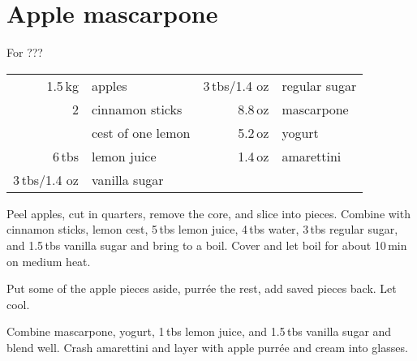 \section{Apple mascarpone}
\begin{centering}
\end{centering}
For ???
\begin{table}[H]
\centering
\begin{tabular*}{1\textwidth}{rlrl}
1.5\,kg & apples & 3\,tbs/1.4 oz & regular sugar \\
2 & cinnamon sticks & 8.8\,oz & mascarpone \\
& cest of one lemon & 5.2\,oz & yogurt \\
6\,tbs & lemon juice & 1.4\,oz & amarettini \\
3\,tbs/1.4 oz & vanilla sugar & & \\
\end{tabular*}
\end{table}

\begin{Notes}

\item Peel apples, cut in quarters, remove the core, and slice into pieces. Combine with cinnamon sticks, lemon cest, 5\,tbs lemon juice, 4\,tbs water, 3\,tbs regular sugar, and 1.5\,tbs vanilla sugar and bring to a boil. Cover and let boil for about 10\,min on medium heat.

\item Put some of the apple pieces aside, purr\'{e}e the rest, add saved pieces back. Let cool.

\item Combine mascarpone, yogurt, 1\,tbs lemon juice, and 1.5\,tbs vanilla sugar and blend well. Crash amarettini and layer with apple purr\'{e}e and cream into glasses.
\end{Notes}


